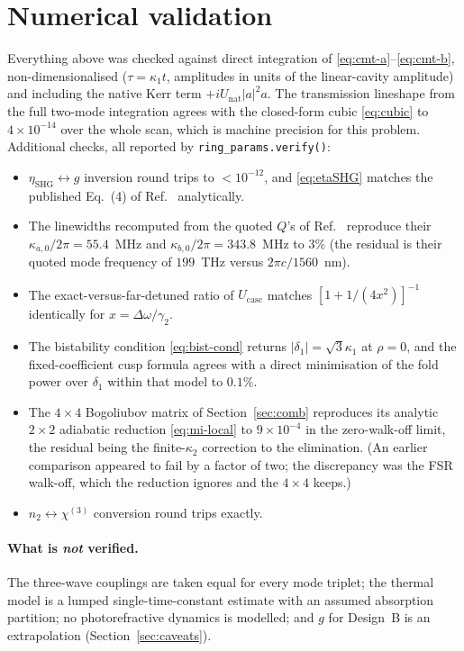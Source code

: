 \documentclass[11pt,a4paper]{article}
\newcommand{\chithree}{\chi^{(3)}}
\newcommand{\Dom}{\Delta\omega}
\newcommand{\Ucasc}{U_{\text{casc}}}
\newcommand{\Unat}{U_{\text{nat}}}
\newcommand{\etanorm}{\eta_{\text{SHG}}}
\begin{document}
\section{Numerical validation}\label{sec:validation}

Everything above was checked against direct integration of
\eqref{eq:cmt-a}--\eqref{eq:cmt-b}, non-dimensionalised
($\tau=\kappa_1t$, amplitudes in units of the linear-cavity amplitude)
and including the native Kerr term $+i\Unat|a|^2a$.  The transmission
lineshape from the full two-mode integration agrees with the closed-form
cubic \eqref{eq:cubic} to $4\times10^{-14}$ over the whole scan, which
is machine precision for this problem.  Additional checks, all reported
by \verb|ring_params.verify()|:

\begin{itemize}[leftmargin=1.6em,itemsep=2pt]
\item $\etanorm\leftrightarrow g$ inversion round trips to $<10^{-12}$,
  and \eqref{eq:etaSHG} matches the published Eq.~(4) of
  Ref.~\cite{Lu2020} analytically.
\item The linewidths recomputed from the quoted $Q$'s of
  Ref.~\cite{Lu2020} reproduce their $\kappa_{a,0}/2\pi=55.4$~MHz and
  $\kappa_{b,0}/2\pi=343.8$~MHz to $3\%$ (the residual is their quoted
  mode frequency of $199$~THz versus $2\pi c/1560$~nm).
\item The exact-versus-far-detuned ratio of $\Ucasc$ matches
  $[1+1/(4x^2)]^{-1}$ identically for $x=\Dom/\gamma_2$.
\item The bistability condition \eqref{eq:bist-cond} returns
  $|\delta_1|=\sqrt3\kappa_1$ at $\rho=0$, and the fixed-coefficient cusp
  formula agrees with a direct minimisation of the fold power over
  $\delta_1$ within that model to $0.1\%$.
\item The $4\times4$ Bogoliubov matrix of Section~\ref{sec:comb}
  reproduces its analytic $2\times2$ adiabatic reduction
  \eqref{eq:mi-local} to $9\times10^{-4}$ in the zero-walk-off limit,
  the residual being the finite-$\kappa_2$ correction to the
  elimination.  (An earlier comparison appeared to fail by a factor of
  two; the discrepancy was the FSR walk-off, which the reduction
  ignores and the $4\times4$ keeps.)
\item $n_2\leftrightarrow\chithree$ conversion round trips exactly.
\end{itemize}

\paragraph{What is \emph{not} verified.}  The three-wave couplings are
taken equal for every mode triplet; the thermal model is a lumped
single-time-constant estimate with an assumed absorption partition; no
photorefractive dynamics is modelled; and $g$ for Design~B is an
extrapolation (Section~\ref{sec:caveats}).
\end{document}

